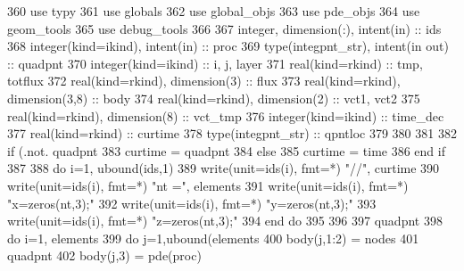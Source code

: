 \begin{DoxyCode}
360     \textcolor{keywordtype}{use }typy
361     \textcolor{keywordtype}{use }globals
362     \textcolor{keywordtype}{use }global_objs
363     \textcolor{keywordtype}{use }pde_objs
364     \textcolor{keywordtype}{use }geom_tools
365     \textcolor{keywordtype}{use }debug_tools
366     
367     \textcolor{keywordtype}{integer}, \textcolor{keywordtype}{dimension(:)}, \textcolor{keywordtype}{intent(in)} :: ids
368     \textcolor{keywordtype}{integer(kind=ikind)}, \textcolor{keywordtype}{intent(in)} :: proc
369     \textcolor{keywordtype}{type}(integpnt_str), \textcolor{keywordtype}{intent(in out)} :: quadpnt
370     \textcolor{keywordtype}{integer(kind=ikind)} :: i, j, layer
371     \textcolor{keywordtype}{real(kind=rkind)} :: tmp, totflux
372     \textcolor{keywordtype}{real(kind=rkind)}, \textcolor{keywordtype}{dimension(3)} :: flux
373     \textcolor{keywordtype}{real(kind=rkind)}, \textcolor{keywordtype}{dimension(3,8)} :: body
374     \textcolor{keywordtype}{real(kind=rkind)}, \textcolor{keywordtype}{dimension(2)} :: vct1, vct2
375     \textcolor{keywordtype}{real(kind=rkind)}, \textcolor{keywordtype}{dimension(8)} :: vct\_tmp
376     \textcolor{keywordtype}{integer(kind=ikind)} :: time\_dec
377     \textcolor{keywordtype}{real(kind=rkind)} :: curtime
378     \textcolor{keywordtype}{type}(integpnt_str) :: qpntloc
379 
380     
381     
382     \textcolor{keywordflow}{if} (.not. quadpnt%
383       curtime = quadpnt%
384     \textcolor{keywordflow}{else}
385       curtime = time
386 \textcolor{keywordflow}{    end if}
387   
388     \textcolor{keywordflow}{do} i=1, ubound(ids,1)
389       \textcolor{keyword}{write}(unit=ids(i), fmt=*) \textcolor{stringliteral}{"//"}, curtime
390       \textcolor{keyword}{write}(unit=ids(i), fmt=*) \textcolor{stringliteral}{"nt ="}, elements%
391       \textcolor{keyword}{write}(unit=ids(i), fmt=*) \textcolor{stringliteral}{"x=zeros(nt,3);"}
392       \textcolor{keyword}{write}(unit=ids(i), fmt=*) \textcolor{stringliteral}{"y=zeros(nt,3);"}
393       \textcolor{keyword}{write}(unit=ids(i), fmt=*) \textcolor{stringliteral}{"z=zeros(nt,3);"}
394 \textcolor{keywordflow}{    end do}
395 
396 
397     quadpnt%
398     \textcolor{keywordflow}{do} i=1, elements%
399       \textcolor{keywordflow}{do} j=1,ubound(elements%
400         body(j,1:2) = nodes%
401         quadpnt%
402         body(j,3) = pde(proc)%

\end{DoxyCode}
